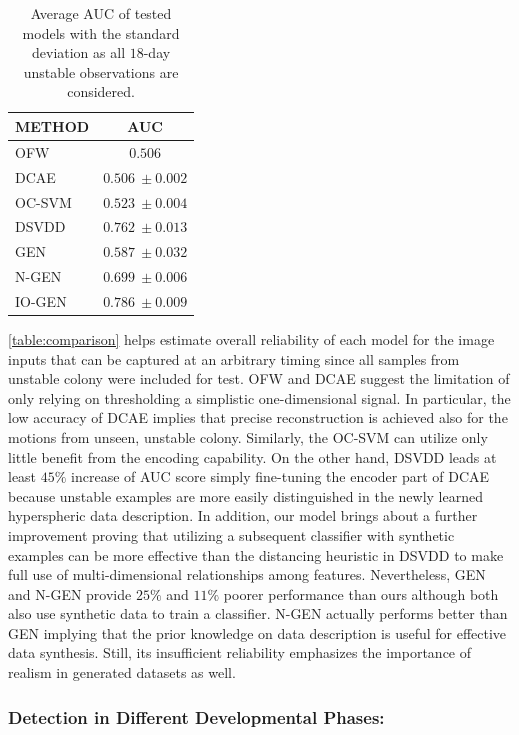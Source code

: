 \documentclass[letterpaper]{article} %
\let\orgautoref\autoref
\providecommand{\Autoref}
{\def\equationautorefname{Equation}%
\def\figureautorefname{Figure}%
\def\subfigureautorefname{Figure}%
\def\Itemautorefname{Item}%
\def\tableautorefname{Table}%
\def\exerciseautorefname{Exercise}%
\def\starexerciseautorefname{Exercise}%
\def\sectionautorefname{Section}%
\def\subsectionautorefname{Section}%
\def\subsubsectionautorefname{Section}%
\def\chapterautorefname{Section}%
\def\partautorefname{Part}%
\orgautoref}
\renewcommand{\autoref}
{\def\equationautorefname{Equation}%
\def\figureautorefname{Fig.}%
\def\subfigureautorefname{Fig.}%
\def\Itemautorefname{item}%
\def\tableautorefname{Table}%
\def\exerciseautorefname{Exercise}%
\def\starexerciseautorefname{Exercise}%
\def\sectionautorefname{Section}%
\def\subsectionautorefname{Section}%
\def\subsubsectionautorefname{Section}%
\def\chapterautorefname{Section}%
\def\partautorefname{Part}%
\orgautoref}
\begin{document}
\setlength{\tabcolsep}{0.5em} %
{\renewcommand{\arraystretch}{1.2}%
\begin{table}[t]
\centering
\begin{tabular}{|p{40mm}c|} %
\hline
METHOD & AUC \\ \hline\hline
OFW & $0.506$ \\ %
DCAE & $0.506~\pm 0.002$ \\ %
OC-SVM & $0.523~\pm 0.004$ \\ %
DSVDD & $0.762~\pm 0.013$ \\ %
GEN & $0.587~\pm 0.032$ \\ %
N-GEN & $0.699~\pm 0.006$ \\ \hline\hline
IO-GEN & $\mathbf{0.786~\pm 0.009}$ \\ \hline
\end{tabular}
\caption{Average AUC of tested models with the standard deviation
as all $18$-day unstable observations are considered.}
\label{table:comparison}
\end{table}
}
\Autoref{table:comparison} helps estimate overall reliability of each
model for the image inputs that can be captured at an arbitrary timing
since all samples from unstable colony were included for test. OFW and
DCAE suggest the limitation of only relying on thresholding a simplistic
one-dimensional signal. In particular, the low accuracy of DCAE implies
that precise reconstruction is achieved also for the motions from
unseen, unstable colony.
Similarly, the OC-SVM can utilize only little benefit from the
encoding capability. On the other hand, DSVDD leads at least $45\%$
increase of AUC score simply fine-tuning the encoder part of DCAE
because unstable examples are more easily distinguished in the newly
learned hyperspheric data description. In addition, our model brings
about a further improvement proving that utilizing a subsequent
classifier with synthetic examples can be more effective than the
distancing heuristic in DSVDD to make full use of multi-dimensional
relationships among features. Nevertheless, GEN and \mbox{N-GEN} provide $25\%$
and $11\%$ poorer performance than ours although both also use synthetic
data to train a classifier. \mbox{N-GEN} actually performs better than GEN
implying that the prior knowledge on data description is useful for
effective data synthesis. Still, its insufficient reliability emphasizes
the importance of realism in generated datasets as well.

\subsubsection{Detection in Different Developmental Phases:}
\label{sec:detection_in_different_developmental_phases}
\end{document}
